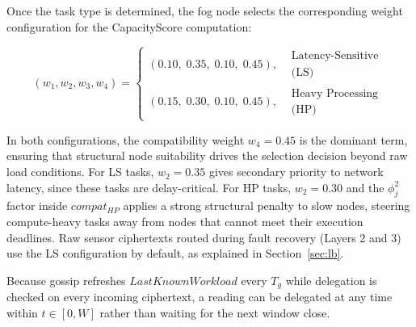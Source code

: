 \documentclass[conference]{IEEEtran}
\begin{document}
    Once the task type is determined, the fog node selects the corresponding weight configuration for the CapacityScore computation:

    \begin{equation}
    (w_1, w_2, w_3, w_4) =
    \begin{cases}
    (0.10,\; 0.35,\; 0.10,\; 0.45), &
    \substack{\text{Latency-Sensitive}\\\text{(LS)}} \\
    (0.15,\; 0.30,\; 0.10,\; 0.45), &
    \substack{\text{Heavy Processing}\\\text{(HP)}}
    \end{cases}
    \end{equation}

    In both configurations, the compatibility weight $w_4 = 0.45$ is the dominant term, ensuring that structural node suitability drives the selection decision beyond raw load conditions. For LS tasks, $w_2 = 0.35$ gives secondary priority to network latency, since these tasks are delay-critical. For HP tasks, $w_2 = 0.30$ and the $\phi_j^2$ factor inside $compat_{HP}$ applies a strong structural penalty to slow nodes, steering compute-heavy tasks away from nodes that cannot meet their execution deadlines. Raw sensor ciphertexts routed during fault recovery (Layers 2 and 3) use the LS configuration by default, as explained in Section~\ref{sec:lb}.

    Because gossip refreshes $LastKnownWorkload$ every $T_g$ while delegation is checked on every incoming ciphertext, a reading can be delegated at any time within $t\in[0,W]$ rather than waiting for the next window close.
\end{document}
